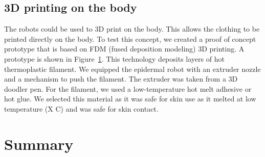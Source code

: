 \subsection{3D printing on the body}    
The robots could be used to 3D print on the body. This allows the clothing to be printed directly on the body. To test this concept, we created a proof of concept prototype that is based on FDM (fused deposition modeling) 3D printing. A prototype is shown in Figure~\ref{}. This technology deposits layers of hot thermoplastic filament.  We equipped the epidermal robot with an extruder nozzle and a mechanism to push the filament. The extruder was taken from a 3D doodler pen. 
For the filament, we used a low-temperature hot melt adhesive or hot glue. We selected this material as it was safe for skin use as it melted at low temperature (X C) and was safe for skin contact. 

\section{Summary}



